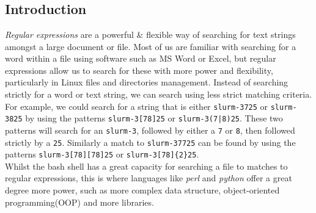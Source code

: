 
\chapter{\moduleTitle}
\newpage

\section{Introduction}
\textit{Regular expressions} are a powerful \& flexible way of searching for text strings amongst a large document or file.
Most of us are familiar with searching for a word within a file using software such as MS Word or Excel, but regular expressions allow us to search for these with more power and flexibility, particularly in Linux files and directories management.
Instead of searching strictly for a word or text string, we can search using less strict matching criteria.
For example, we could search for a string that is either \texttt{slurm-3725} or \texttt{slurm-3825} by using the patterns  \texttt{slurm-3[78]25} or  \texttt{slurm-3(7|8)25}.
These two patterns will search for an  \texttt{slurm-3}, followed by either a  \texttt{7} or  \texttt{8}, then followed strictly by a  \texttt{25}.
Similarly a match to \texttt{slurm-37725} can be found by using the patterns \texttt{slurm-3[78][78]25} or  \texttt{slurm-3[78]\{2\}25}. \\

Whilst the bash shell has a great capacity for searching a file to matches to regular expressions, this is where languages like \textit{perl} and \textit{python} offer a great degree more power, such as more complex data structure, object-oriented programming(OOP) and more libraries.

